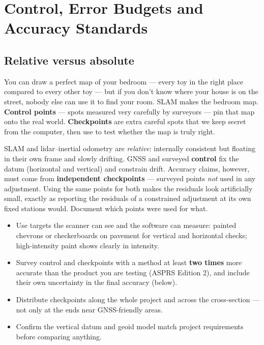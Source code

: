 \chapter{Control, Error Budgets and Accuracy Standards}

\section{Relative versus absolute}
\begin{kid}
You can draw a perfect map of your bedroom --- every toy in the right place compared to every other toy --- but if you don't know where your house is on the street, nobody else can use it to find your room. SLAM makes the bedroom map. \textbf{Control points} --- spots measured very carefully by surveyors --- pin that map onto the real world. \textbf{Checkpoints} are extra careful spots that we keep secret from the computer, then use to test whether the map is truly right.
\end{kid}


\begin{eng}
SLAM and lidar--inertial odometry are \emph{relative}: internally consistent but floating in their own frame and slowly drifting. GNSS and surveyed \textbf{control} fix the datum (horizontal and vertical) and constrain drift. Accuracy claims, however, must come from \textbf{independent checkpoints} --- surveyed points \emph{not} used in any adjustment. Using the same points for both makes the residuals look artificially small, exactly as reporting the residuals of a constrained adjustment at its own fixed stations would. Document which points were used for what.
\end{eng}

\begin{tip}
\begin{itemize}
\item Use targets the scanner can see and the software can measure: painted chevrons or checkerboards on pavement for vertical and horizontal checks; high-intensity paint shows clearly in intensity.
\item Survey control and checkpoints with a method at least \textbf{two times} more accurate than the product you are testing (ASPRS Edition 2), and include their own uncertainty in the final accuracy (below).
\item Distribute checkpoints along the whole project and across the cross-section --- not only at the ends near GNSS-friendly areas.
\item Confirm the vertical datum and geoid model match project requirements before comparing anything.
\end{itemize}
\end{tip}

